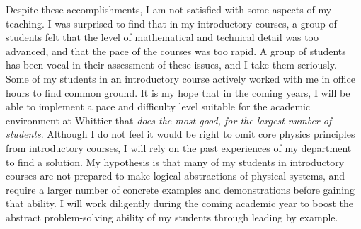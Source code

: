 \documentclass[../../main.tex]{subfiles}
\begin{document}
Despite these accomplishments, I am not satisfied with some aspects of my teaching.  I was surprised to find that in my introductory courses, a group of students felt that the level of mathematical and technical detail was too advanced, and that the pace of the courses was too rapid.  A group of students has been vocal in their assessment of these issues, and I take them seriously.  Some of my students in an introductory course actively worked with me in office hours to find common ground.  It is my hope that in the coming years, I will be able to implement a pace and difficulty level suitable for the academic environment at Whittier that \textit{does the most good, for the largest number of students}.  Although I do not feel it would be right to omit core physics principles from introductory courses, I will rely on the past experiences of my department to find a solution.  My hypothesis is that many of my students in introductory courses are not prepared to make logical abstractions of physical systems, and require a larger number of concrete examples and demonstrations before gaining that ability.  I will work diligently during the coming academic year to boost the abstract problem-solving ability of my students through leading by example.
\end{document}
